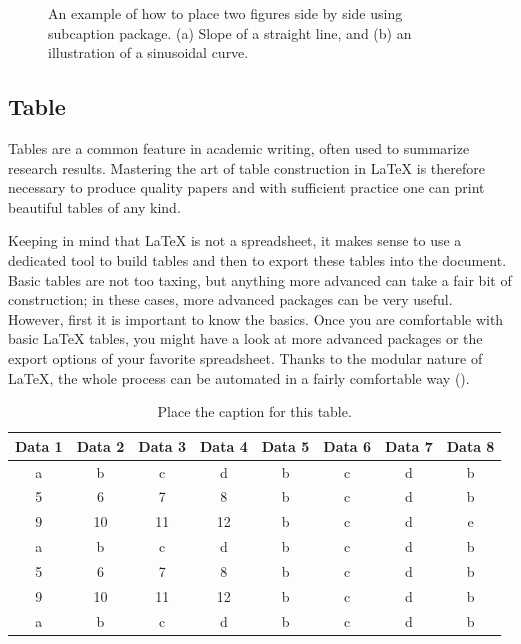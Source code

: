 \documentclass[11pt, a4paper]{article}
\begin{document}
\begin{figure}
\begin{subfigure}[b]{0.45\linewidth}
		\caption{}
		\label{fig:sine-graph}
	\end{subfigure}
	\caption{An example of how to place two figures side by side using subcaption package. (a) Slope of a straight line, and (b) an illustration of a sinusoidal curve.}
	\label{fig:subfigs cap}
\end{figure}

\subsection{Table}
Tables are a common feature in academic writing, often used to summarize research results. Mastering the art of table construction in LaTeX is therefore necessary to produce quality papers and with sufficient practice one can print beautiful tables of any kind.

Keeping in mind that LaTeX is not a spreadsheet, it makes sense to use a dedicated tool to build tables and then to export these tables into the document. Basic tables are not too taxing, but anything more advanced can take a fair bit of construction; in these cases, more advanced packages can be very useful. However, first it is important to know the basics. Once you are comfortable with basic LaTeX tables, you might have a look at more advanced packages or the export options of your favorite spreadsheet. Thanks to the modular nature of LaTeX, the whole process can be automated in a fairly comfortable way ().

\begin{table}
	\centering
	\caption{Place the caption for this table.}
	\label{tab:sample2}
	\renewcommand{\arraystretch}{1.5}
	\begin{tabular*}{\linewidth}{c @{\extracolsep{\fill}} ccccccc}
		\hline 
		Data 1 & Data 2 & Data 3 & Data 4 & Data 5 & Data 6 & Data 7 & Data 8\\ \hline
		a & b & c & d & b & c & d & b \\ 
		5 & 6 & 7 & 8 & b & c & d & b \\ 
		9 & 10 & 11 & 12 & b  & c & d & e \\ 
		a & b & c & d & b & c & d & b \\ 
		5 & 6 & 7 & 8 & b & c & d & b \\ 
		9 & 10 & 11 & 12 & b & c  & d & b \\ 
		a & b & c & d & b & c & d & b \\ \hline 
	\end{tabular*} 
\end{table}
\end{document}
